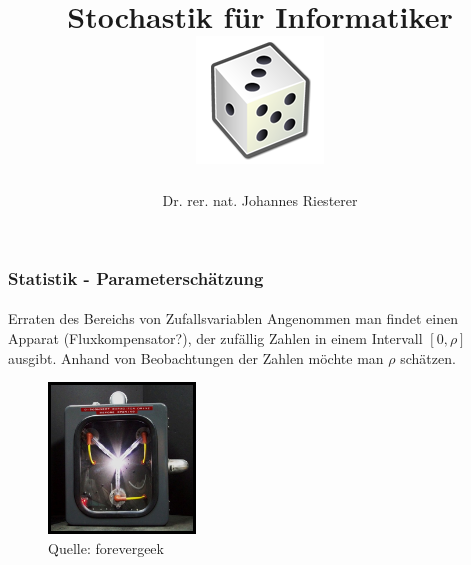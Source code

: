 \documentclass{beamer}
\begin{document}
\title[Stochastik] %
{Stochastik für Informatiker
\\
\includegraphics[scale=0.5]{img/craps}
}
\subtitle{}
\author[Dr. Johannes Riesterer] %
{Dr.  rer. nat. Johannes Riesterer}

\date[KPT 2004] %
{}

\subject{Stochastik}


\frame{\titlepage}






\begin{frame}
    \frametitle{Statistik - Parameterschätzung}
\framesubtitle{}

\begin{block}{Erraten des Bereichs von Zufallsvariablen}
Angenommen man findet einen Apparat (Fluxkompensator?), der zufällig Zahlen in einem Intervall $[0, \rho]$ ausgibt. Anhand von Beobachtungen der Zahlen möchte man $\rho$ schätzen.
\end{block}

\begin{figure}[htp]
      \centering
    \includegraphics[width=0.35\textwidth]{img/flux}
      \caption{Quelle: forevergeek}
\end{figure}
 \end{frame}
\end{document}
